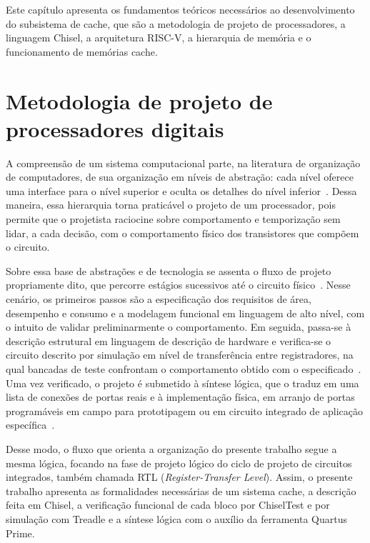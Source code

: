 Este capítulo apresenta os fundamentos teóricos necessários ao desenvolvimento do subsistema de cache, que são a metodologia de projeto de processadores, a linguagem Chisel, a arquitetura RISC-V, a hierarquia de memória e o funcionamento de memórias cache.

\section{Metodologia de projeto de processadores digitais}\label{sec:2.1}

A compreensão de um sistema computacional parte, na literatura de organização de computadores, de sua organização em níveis de abstração: cada nível oferece uma interface para o nível superior e oculta os detalhes do nível inferior~\cite{patterson2020computer}. Dessa maneira, essa hierarquia torna praticável o projeto de um processador, pois permite que o projetista raciocine sobre comportamento e temporização sem lidar, a cada decisão, com o comportamento físico dos transistores que compõem o circuito.

Sobre essa base de abstrações e de tecnologia se assenta o fluxo de projeto propriamente dito, que percorre estágios sucessivos até o circuito físico~\cite{weste2011cmos}. Nesse cenário, os primeiros passos são a especificação dos requisitos de área, desempenho e consumo e a modelagem funcional em linguagem de alto nível, com o intuito de validar preliminarmente o comportamento. Em seguida, passa-se à descrição estrutural em linguagem de descrição de hardware e verifica-se o circuito descrito por simulação em nível de transferência entre registradores, na qual bancadas de teste confrontam o comportamento obtido com o especificado~\cite{bergeron2006testbenches}. Uma vez verificado, o projeto é submetido à síntese lógica, que o traduz em uma lista de conexões de portas reais e à implementação física, em arranjo de portas programáveis em campo para prototipagem ou em circuito integrado de aplicação específica~\cite{weste2011cmos}.

Desse modo, o fluxo que orienta a organização do presente trabalho segue a mesma lógica, focando na fase de projeto lógico do ciclo de projeto de circuitos integrados, também chamada RTL (\emph{Register-Transfer Level}). Assim, o presente trabalho apresenta as formalidades necessárias de um sistema cache, a descrição feita em Chisel, a verificação funcional de cada bloco por ChiselTest e por simulação com Treadle e a síntese lógica com o auxílio da ferramenta Quartus Prime.

